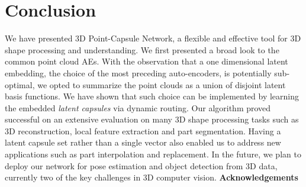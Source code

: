 \documentclass[10pt,twocolumn,letterpaper]{article}
\theoremstyle{break}
\begin{document}
 \vspace{-2mm}\section{Conclusion}\vspace{-1mm}
\label{sec:conclusion}
We have presented 3D Point-Capsule Network, a flexible and effective tool for 3D shape processing and understanding. We first presented a broad look to the common point cloud AEs. With the observation that a one dimensional latent embedding, the choice of the most preceding auto-encoders, is potentially sub-optimal, we opted to summarize the point clouds as a union of disjoint latent basis functions. We have shown that such choice can be implemented by learning the embedded \textit{latent capsules} via dynamic routing. Our algorithm proved successful on an extensive evaluation on many 3D shape processing tasks such as 3D reconstruction, local feature extraction and part segmentation. Having a latent capsule set rather than a single vector also enabled us to address new applications such as part interpolation and replacement. In the future, we plan to deploy our network for pose estimation and object detection from 3D data, currently two of the key challenges in 3D computer vision. 
\noindent \textbf{Acknowledgements }
\end{document}
